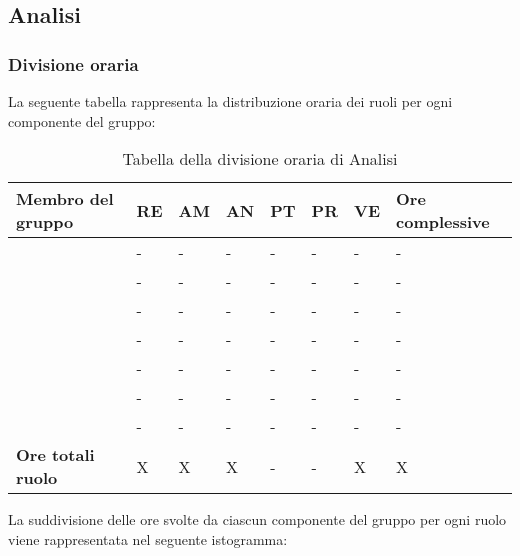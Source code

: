 \subsection{Analisi}

\subsubsection{Divisione oraria}
La seguente tabella rappresenta la distribuzione oraria dei ruoli per ogni componente del gruppo:
{

\renewcommand{\arraystretch}{2}
\begin{longtable}[h!] { C{4cm} C{1cm} C{1cm} C{1cm} C{1cm} C{1cm} C{1cm} C{3cm}}
\caption{Tabella della divisione oraria di Analisi}	\\
\rowcolor{\primaryColor}

\textcolor{\secondaryColor}{\textbf{Membro del gruppo}} & 
\textcolor{\secondaryColor}{\textbf{RE}} & 
\textcolor{\secondaryColor}{\textbf{AM}} & 
\textcolor{\secondaryColor}{\textbf{AN}} & 
\textcolor{\secondaryColor}{\textbf{PT}} & 
\textcolor{\secondaryColor}{\textbf{PR}} & 
\textcolor{\secondaryColor}{\textbf{VE}} & 
\textcolor{\secondaryColor}{\textbf{Ore complessive}}\\	
\endhead

\AD{}                     &  - &  - &  - & - & - & - & - \\
\AT{}                     &  - &  - &  - & - & - & - & - \\
\AW{}                     &  - &  - &  - & - & - & - & - \\
\EC{}                     &  - &  - &  - & - & - & - & - \\
\EM{}                     &  - &  - &  - & - & - & - & - \\
\FP{}                     &  - &  - &  - & - & - & - & - \\
\GG{}                     &  - &  - &  - & - & - & - & - \\
\textbf{Ore totali ruolo} & X & X & X & - & - & X & X \\

\end{longtable}
}
\clearpage
La suddivisione delle ore svolte da ciascun componente del gruppo per ogni ruolo viene rappresentata nel seguente istogramma:

